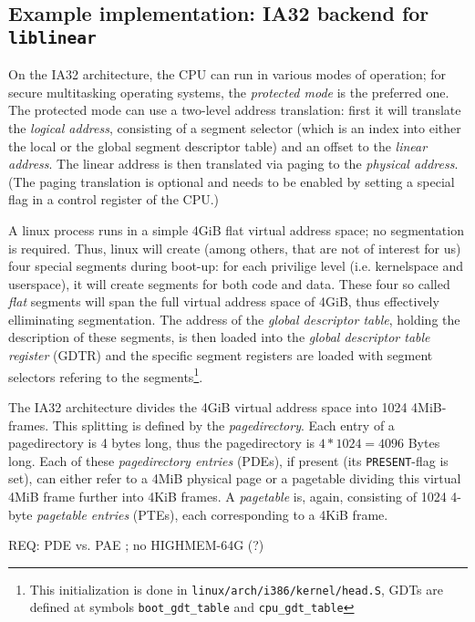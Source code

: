 \subsection{Example implementation: IA32 backend for \texttt{liblinear}}

On the IA32 architecture, the CPU can run in various modes of operation; for
secure multitasking operating systems, the \emph{protected mode} is the
preferred one.  The protected mode can use a two-level address translation:
first it will translate the \emph {logical address}, consisting of a segment
selector (which is an index into either the local or the global segment
descriptor table) and an offset to the \emph{linear address}.  The linear
address is then translated via paging to the \emph{physical address}. (The
paging translation is optional and needs to be enabled by setting a special flag
in a control register of the CPU.)

\label{linux_gdt} A linux process runs in a simple 4GiB flat virtual address
space; no segmentation is required. Thus, linux will create (among others, that
are not of interest for us) four special segments during boot-up: for each
privilige level (i.e. kernelspace and userspace), it will create segments for
both code and data. These four so called \emph{flat} segments will span the full
virtual address space of 4GiB, thus effectively elliminating segmentation. The
address of the \emph{global descriptor table}, holding the description of these
segments, is then loaded into the \emph{global descriptor table register} (GDTR)
and the specific segment registers are loaded with segment selectors refering to
the segments\footnote{This initialization is done in
\texttt{linux/arch/i386/kernel/head.S}, GDTs are defined at symbols
\texttt{boot\_gdt\_table} and \texttt{cpu\_gdt\_table}}.

The IA32 architecture divides the 4GiB virtual address space into 1024
4MiB-frames. This splitting is defined by the \emph{pagedirectory}. Each entry
of a pagedirectory is 4 bytes long, thus the pagedirectory is $4*1024 = 4096$
Bytes long. Each of these \emph{pagedirectory entries} (PDEs), if present (its
\texttt{PRESENT}-flag is set), can either refer to a 4MiB physical page or a
pagetable dividing this virtual 4MiB frame further into 4KiB frames. A
\emph{pagetable} is, again, consisting of 1024 4-byte \emph{pagetable entries}
(PTEs), each corresponding to a 4KiB frame.

REQ: PDE vs. PAE ; no HIGHMEM-64G (?)



